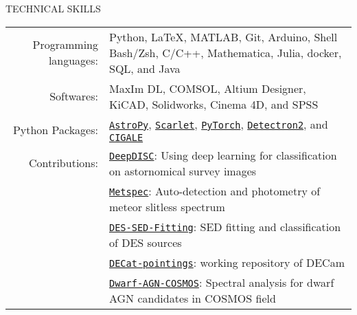 \documentclass[10pt]{article} %
\begin{document}
\begin{section}{TECHNICAL SKILLS}

\begin{tabular}{rl}
    Programming languages: & Python, \LaTeX, MATLAB, Git, Arduino, Shell Bash/Zsh, C/C++, Mathematica, Julia, docker, SQL, and Java \\
    Softwares: & MaxIm DL, COMSOL, Altium Designer, KiCAD, Solidworks, Cinema 4D, and SPSS \\
    Python Packages: & \href{https://www.astropy.org/}{\texttt{AstroPy}}, \href{https://github.com/pmelchior/scarlet}{\texttt{Scarlet}}, \href{https://pytorch.org/}{\texttt{PyTorch}}, \href{https://github.com/facebookresearch/detectron2}{\texttt{Detectron2}}, and \href{https://cigale.lam.fr/}{\texttt{CIGALE}} \\
    Contributions: & \href{https://github.com/burke86/deepdisc}{\texttt{DeepDISC}}: Using deep learning for classification on astornomical survey images \\
    & \href{https://github.com/Chisen-Lupus/metspec}{\texttt{Metspec}}: Auto-detection and photometry of meteor slitless spectrum \\
    & \href{https://github.com/Chisen-Lupus/DES-SED-fitting}{\texttt{DES-SED-Fitting}}: SED fitting and classification of DES sources \\
    & \href{https://github.com/gnarayan/decat_pointings}{\texttt{DECat-pointings}}: working repository of DECam \\
    & \href{https://github.com/burke86/dwarf_agn_cosmos}{\texttt{Dwarf-AGN-COSMOS}}: Spectral analysis for dwarf AGN candidates in COSMOS field
\end{tabular}

\end{section} 
\end{document}
